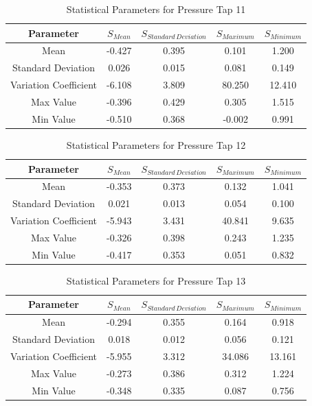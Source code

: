 \documentclass[11pt,a4paper,titlepage]{report}
\begin{document}
\begin{appendix}
\begin{table}[h]
\begin{tabular}{c|c|c|c|c}
   Parameter  & $S_{Mean}$ & $S_{Standard\,Deviation}$ & $S_{Maximum}$ &	$S_{Minimum}$ \\
    \hline
  Mean                  & -0.427 & 0.395 & 0.101  & 1.200  \\
Standard Deviation    & 0.026  & 0.015 & 0.081  & 0.149  \\
Variation Coefficient & -6.108 & 3.809 & 80.250 & 12.410 \\
Max Value             & -0.396 & 0.429 & 0.305  & 1.515  \\
Min Value             & -0.510 & 0.368 & -0.002 & 0.991 
    \end{tabular}
    \caption{Statistical Parameters for Pressure Tap 11}
    \label{tab:wind statistical parameters 11}
\end{table}
\begin{table}[h]
    \centering
    \begin{tabular}{c|c|c|c|c}
   Parameter  & $S_{Mean}$ & $S_{Standard\,Deviation}$ & $S_{Maximum}$ &	$S_{Minimum}$ \\
    \hline
   Mean                  & -0.353 & 0.373 & 0.132  & 1.041 \\
Standard Deviation    & 0.021  & 0.013 & 0.054  & 0.100 \\
Variation Coefficient & -5.943 & 3.431 & 40.841 & 9.635 \\
Max Value             & -0.326 & 0.398 & 0.243  & 1.235 \\
Min Value             & -0.417 & 0.353 & 0.051  & 0.832
    \end{tabular}
    \caption{Statistical Parameters for Pressure Tap 12}
    \label{tab:wind statistical parameters 12}
\end{table}
\begin{table}[h]
    \centering
    \begin{tabular}{c|c|c|c|c}
   Parameter  & $S_{Mean}$ & $S_{Standard\,Deviation}$ & $S_{Maximum}$ &	$S_{Minimum}$ \\
    \hline
Mean                  & -0.294 & 0.355 & 0.164  & 0.918  \\
Standard Deviation    & 0.018  & 0.012 & 0.056  & 0.121  \\
Variation Coefficient & -5.955 & 3.312 & 34.086 & 13.161 \\
Max Value             & -0.273 & 0.386 & 0.312  & 1.224  \\
Min Value             & -0.348 & 0.335 & 0.087  & 0.756 
    \end{tabular}
    \caption{Statistical Parameters for Pressure Tap 13}

\end{table}
\end{appendix}
\end{document}
